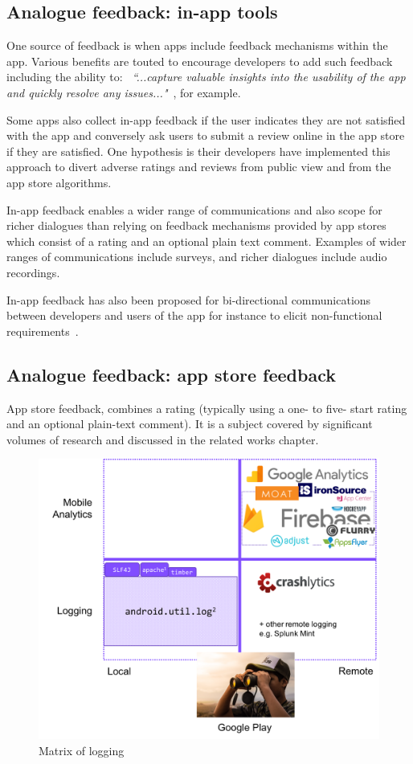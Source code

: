 \subsection{Analogue feedback: in-app tools}
One source of feedback is when apps include feedback mechanisms within the app. Various benefits are touted to encourage developers to add such feedback including the ability to: ~\emph{``...capture valuable insights into the usability of the app and quickly resolve any issues..."}~\citep{mopinion2017_top11_mobile_in_app_feedback_tools}, for example. 

Some apps also collect in-app feedback if the user indicates they are not satisfied with the app and conversely ask users to submit a review online in the app store if they are satisfied. One hypothesis is their developers have implemented this approach to divert adverse ratings and reviews from public view and from the app store algorithms. 

In-app feedback enables a wider range of communications and also scope for richer dialogues than relying on feedback mechanisms provided by app stores which consist of a rating and an optional plain text comment. Examples of wider ranges of communications include surveys, and richer dialogues include audio recordings.

In-app feedback has also been proposed for bi-directional communications between developers and users of the app for instance to elicit non-functional requirements~\citep{avellis_harty_yu_towards_mobile_twin_peaks}.

\subsection{Analogue feedback: app store feedback}
App store feedback, combines a rating (typically using a one- to five- start rating and an optional plain-text comment). It is a subject covered by significant volumes of research and discussed in the related works chapter. %

\begin{figure}[ht]
    \centering
    \includegraphics[width=12cm]{images/matrix-of-logging.png}
    \caption{Matrix of logging}
    \label{fig:matrix-of-logging}
\end{figure}

